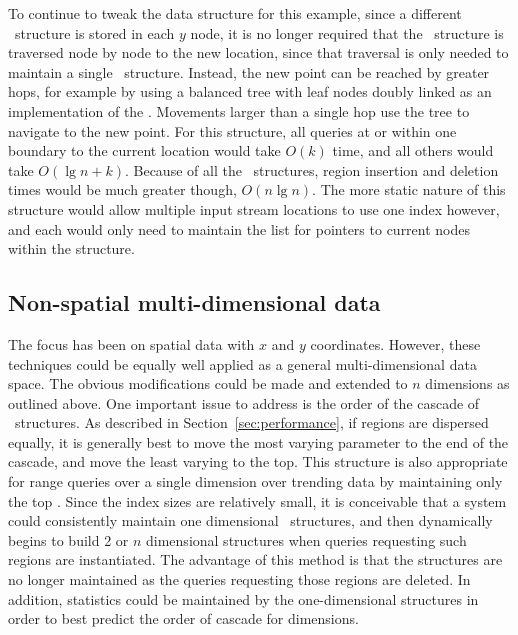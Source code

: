 \documentclass{stdbm}
\newcommand{\List}{\id{List}}
\newcommand{\YList}{\id{2-Key-List}}
\newcommand{\inC}[1]{{\id{DCT_{#1}}}}
\newcommand{\X}{{\inC{X}}}
\newcommand{\Y}{{\inC{Y}}}
\begin{document}
To continue to tweak the data structure for this example, since a
different \X\ structure is stored in each $y$ node, it is no longer
required that the \Y\ structure is traversed node by node to the new
location, since that traversal is only needed to maintain a single \X\
structure.  Instead, the new point can be reached by greater hops, for
example by using a balanced tree with leaf nodes doubly linked as an
implementation of the \YList.  Movements larger than a single hop use
the tree to navigate to the new point.  For this structure, all
queries at or within one boundary to the current location would take
$O(k)$ time, and all others would take $O(\lg{n}+k)$.  Because of all
the \X\ structures, region insertion and deletion times would be much
greater though, $O(n\lg{n})$.  The more static nature of this structure
would allow multiple input stream locations to use one index however,
and each would only need to maintain the list for pointers to current
nodes within the structure.

\vspace*{-1ex}
\subsection{Non-spatial multi-dimensional data}
%
The focus has been on spatial data with $x$ and $y$ coordinates.
However, these techniques could be equally well applied as a general
multi-dimensional data space.  The obvious modifications could be made
and extended to $n$ dimensions as outlined above.  One important issue
to address is the order of the cascade of \List\ structures.  As
described in Section~\ref{sec:performance}, if regions are dispersed
 equally, it is generally best to move the most varying
parameter to the end of the cascade, and move the least varying to the
top.  This structure is also appropriate for range queries over a
single dimension over trending data by maintaining only the top
\YList.  Since the index sizes are relatively small, it is conceivable
that a system could consistently maintain one dimensional \id{DCT}\ 
structures, and then dynamically begins to build 2 or $n$ dimensional
structures when queries requesting such regions are instantiated.  The
advantage of this method is that the structures are no longer
maintained as the queries requesting those regions are deleted.  In
addition, statistics could be maintained by the one-dimensional
structures in order to best predict the order of cascade for
dimensions.

\end{document}
